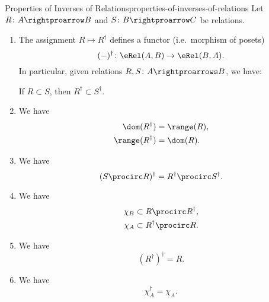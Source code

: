 \begin{proposition}{Properties of Inverses of Relations}{properties-of-inverses-of-relations}%
    Let $R\colon A\rightproarrow B$ and $S\colon B\rightproarrow C$ be relations.
    \begin{enumerate}
        \item\label{properties-of-inverses-of-relations-functoriality}The assignment $R\mapsto R^{\dagger}$ defines a functor (i.e.\ morphism of posets)
            \[
                (-)^{\dagger}%
                \colon%
                \eRel(A,B)%
                \to%
                \eRel(B,A).%
            \]%
            In particular, given relations $R,S\colon A\rightproarrows B$, we have:
            \begin{itemize}
                \itemstar If $R\subset S$, then $R^{\dagger}\subset S^{\dagger}$.
            \end{itemize}
        \item\label{properties-of-inverses-of-relations-interaction-with-ranges-and-domains}We have
            \begin{align*}
                \dom(R^{\dagger})   &= \range(R),\\
                \range(R^{\dagger}) &= \dom(R).
            \end{align*}
        \item\label{properties-of-inverses-of-relations-interaction-with-composition-1}We have
            \[
                (S\procirc R)^{\dagger}
                =
                R^{\dagger}\procirc S^{\dagger}.
            \]%
        \item\label{properties-of-inverses-of-relations-interaction-with-composition-2}We have
            \begin{align*}
                \chi_{B} &\subset R\procirc R^{\dagger},\\
                \chi_{A} &\subset R^{\dagger}\procirc R.
            \end{align*}
        \item\label{properties-of-inverses-of-relations-invertibility}We have
            \[
                (R^{\dagger})^{\dagger}
                =
                R.
            \]%
        \item\label{properties-of-inverses-of-relations-identity}We have
            \[
                \chi^{\dagger}_{A}
                =
                \chi_{A}.
            \]%
    \end{enumerate}
\end{proposition}
